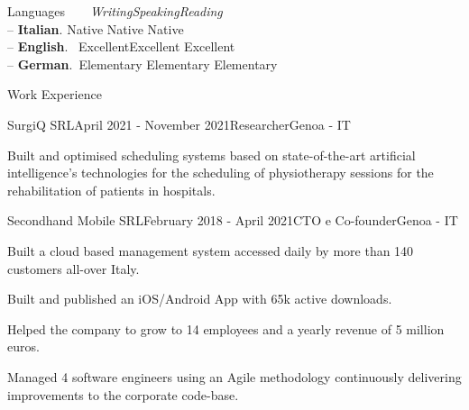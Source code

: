 \documentclass{resume} %
\begin{document}
\pagebreak

\begin{rSection}{Languages}
\qquad\qquad\,\,\,\,\,\,\,\, \textit{Writing}\hfill\textit{Speaking}\hfill\textit{Reading}\\
-- \textbf{Italian}. \quad Native \hfill Native \hfill  Native\\
-- \textbf{English}. \-\, Excellent\hfill Excellent \hfill Excellent\\
-- \textbf{German}. \-\,Elementary \hfill Elementary \hfill Elementary\\
\end{rSection}




\begin{rSection}{Work Experience}


\begin{rSubsection}{SurgiQ SRL}{April 2021 - November 2021}{Researcher}{Genoa - IT}
\item Built and optimised scheduling systems based on state-of-the-art artificial intelligence's technologies for the scheduling of physiotherapy sessions for the rehabilitation of patients in hospitals.
\end{rSubsection}

\begin{rSubsection}{Secondhand Mobile SRL}{February 2018 - April 2021}{CTO e Co-founder}{Genoa - IT}
\item Built a cloud based management system accessed daily by more than 140 customers all-over Italy. 
\item Built and published an iOS/Android App with 65k active downloads. 
\item Helped the company to grow to 14 employees and a yearly revenue of 5 million euros. 
\item Managed 4 software engineers using an Agile methodology continuously delivering improvements to the corporate code-base.
\end{rSubsection}




\end{rSection}



\end{document}
